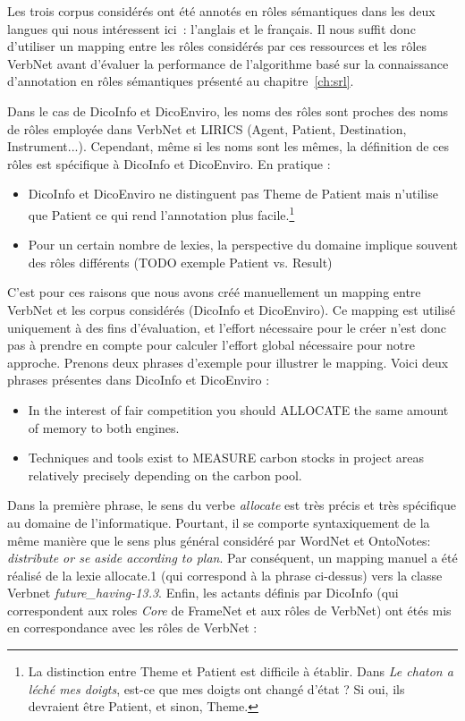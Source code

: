 Les trois corpus considérés ont été annotés en rôles sémantiques dans les deux
langues qui nous intéressent ici~: l'anglais et le français. Il nous suffit
donc d'utiliser un mapping entre les rôles considérés par ces ressources et les
rôles VerbNet avant d'évaluer la performance de l'algorithme basé sur la
connaissance d'annotation en rôles sémantiques présenté au
chapitre~\ref{ch:srl}.

Dans le cas de DicoInfo et DicoEnviro, les noms des rôles sont proches des noms
de rôles employée dans VerbNet et LIRICS \citep{bonial2011hierarchical} (Agent,
Patient, Destination, Instrument...). Cependant, même si les noms sont les
mêmes, la définition de ces rôles est spécifique à DicoInfo et DicoEnviro.
En pratique :

\begin{itemize}
    \item DicoInfo et DicoEnviro ne distinguent pas Theme de Patient mais
    n'utilise que Patient ce qui rend l'annotation plus facile.\footnote{La
    distinction entre Theme et Patient est difficile à établir. Dans \textit{Le
    chaton a léché mes doigts}, est-ce que mes doigts ont changé d'état ? Si oui,
    ils devraient être Patient, et sinon, Theme.\citep[p.~5]{palmer2010semantic}}
    \item Pour un certain nombre de lexies, la perspective du domaine implique
    souvent des rôles différents (TODO exemple Patient vs. Result) %
\end{itemize}

C'est pour ces raisons que nous avons créé manuellement un mapping entre
VerbNet et les corpus considérés (DicoInfo et DicoEnviro). Ce mapping est
utilisé uniquement à des fins d'évaluation, et l'effort nécessaire pour le
créer n'est donc pas à prendre en compte pour calculer l'effort global
nécessaire pour notre approche. Prenons deux phrases d'exemple pour illustrer
le mapping. Voici deux phrases présentes dans DicoInfo et DicoEnviro :

\begin{itemize}
    \item In the interest of fair competition you should ALLOCATE the same amount of memory to both engines.
    \item Techniques and tools exist to MEASURE carbon stocks in project areas relatively precisely depending on the carbon pool.
\end{itemize}

Dans la première phrase, le sens du verbe \textit{allocate} est très précis et
très spécifique au domaine de l'informatique. Pourtant, il se comporte
syntaxiquement de la même manière que le sens plus général considéré par
WordNet et OntoNotes: \textit{distribute or se aside according to plan}. Par
conséquent, un mapping manuel a été réalisé de la lexie allocate.1 (qui
correspond à la phrase ci-dessus) vers la classe Verbnet
\textit{future\_having-13.3}. Enfin, les actants définis par DicoInfo (qui
correspondent aux roles \textit{Core} de FrameNet et aux rôles de VerbNet) ont
étés mis en correspondance avec les rôles de VerbNet :


